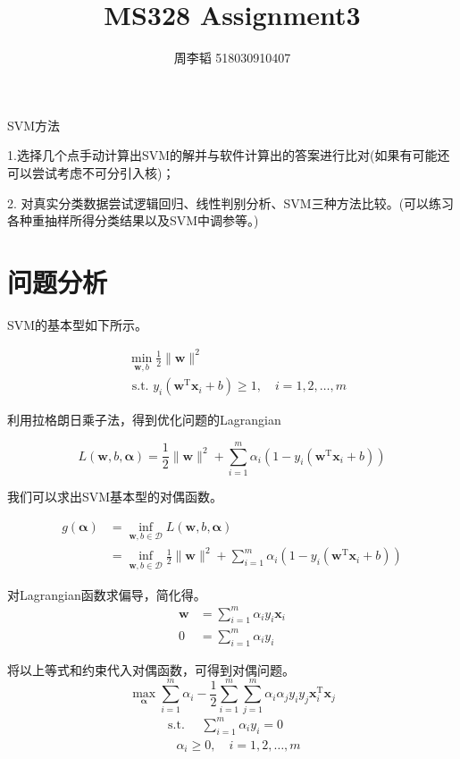 \documentclass[11pt]{article}
\title{MS328 Assignment3}
\author{周李韬 518030910407}
\begin{document}
    
    \maketitle
    
    

    
    SVM方法 
    
1.选择几个点手动计算出SVM的解并与软件计算出的答案进行比对(如果有可能还可以尝试考虑不可分引入核)；

2. 对真实分类数据尝试逻辑回归、线性判别分析、SVM三种方法比较。(可以练习各种重抽样所得分类结果以及SVM中调参等。)

    \section{问题分析}\label{ux95eeux9898ux5206ux6790}

SVM的基本型如下所示。

\[\begin{aligned}
&\min _{\boldsymbol{w}, b} \frac{1}{2}\|\boldsymbol{w}\|^{2}\\
&\text { s.t. } y_{i}\left(\boldsymbol{w}^{\mathrm{T}} \boldsymbol{x}_{i}+b\right) \geqslant 1, \quad i=1,2, \ldots, m
\end{aligned}\]

利用拉格朗日乘子法，得到优化问题的Lagrangian

\[L(\boldsymbol{w}, b, \boldsymbol{\alpha})=\frac{1}{2}\|\boldsymbol{w}\|^{2}+\sum_{i=1}^{m} \alpha_{i}\left(1-y_{i}\left(\boldsymbol{w}^{\mathrm{T}} \boldsymbol{x}_{i}+b\right)\right)\]

我们可以求出SVM基本型的对偶函数。

\[\begin{aligned}
g(\boldsymbol{\alpha})&=\inf _{\boldsymbol{w}, b \in \mathcal{D}} L(\boldsymbol{w}, b, \boldsymbol{\alpha})\\
&= \inf _{\boldsymbol{w}, b \in \mathcal{D}} \frac{1}{2}\|\boldsymbol{w}\|^{2}+\sum_{i=1}^{m} \alpha_{i}\left(1-y_{i}\left(\boldsymbol{w}^{\mathrm{T}} \boldsymbol{x}_{i}+b\right)\right)
\end{aligned}\]

对Lagrangian函数求偏导，简化得。 \[\begin{aligned}
\boldsymbol{w} &=\sum_{i=1}^{m} \alpha_{i} y_{i} \boldsymbol{x}_{i} \\
0 &=\sum_{i=1}^{m} \alpha_{i} y_{i}
\end{aligned}\]

将以上等式和约束代入对偶函数，可得到对偶问题。
\[\max _{\boldsymbol{\alpha}} \sum_{i=1}^{m} \alpha_{i}-\frac{1}{2} \sum_{i=1}^{m} \sum_{j=1}^{m} \alpha_{i} \alpha_{j} y_{i} y_{j} \boldsymbol{x}_{i}^{\mathrm{T}} \boldsymbol{x}_{j}\]
\[\begin{array}{l}
\text { s.t. } \quad \sum_{i=1}^{m} \alpha_{i} y_{i}=0 \\
\quad \alpha_{i} \geqslant 0, \quad i=1,2, \ldots, m
\end{array}\]
\end{document}
